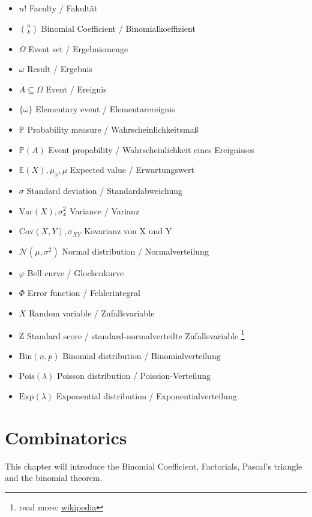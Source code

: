 \documentclass[twoside, a4paper, twocolumn]{article}
\begin{document}
    \begin{itemize}
       \item $n!$ Faculty / Fakultät
       \item $\binom{n}{k}$ Binomial Coefficient / Binomialkoeffizient
       \item $\Omega$ Event set / Ergebnismenge
       \item $\omega$ Result / Ergebnis
       \item $A \subseteq \Omega$ Event / Ereignis
       \item $\{\omega\}$ Elementary event / Elementarereignis
       \item $\mathbb{P}$ Probability measure / Wahrscheinlichkeitsmaß
       \item $\mathbb{P}(A)$ Event propability / Wahrscheinlichkeit eines Ereignisses
       \item $\mathbb{E}(X), \mu_x, \mu$ Expected value / Erwartungswert
       \item $\sigma$ Standard deviation / Standardabweichung
       \item $\mathrm{Var}(X), \sigma^2_x$ Variance / Varianz
       \item $\mathrm{Cov}(X,Y), \sigma_{XY}$ Kovarianz von X und Y
       \item $\mathcal{N}(\mu, \sigma^2)$ Normal distribution / Normalverteilung
       \item $\varphi$ Bell curve / Glockenkurve
       \item $\Phi$ Error function / Fehlerintegral
       \item $X$ Random variable / Zufallsvariable
       \item $\mathrm{Z}$ Standard score / standard-normalverteilte
           Zufallsvariable
           \footnote{read more: \href{https://en.wikipedia.org/wiki/Standard_score}{wikipedia}}
       \item $\textrm{Bin}(n, p)$ Binomial distribution / Binomialverteilung
       \item $\textrm{Pois}(\lambda)$ Poisson distribution / Poission-Verteilung
       \item $\textrm{Exp}(\lambda)$ Exponential distribution / Exponentialverteilung
    \end{itemize}

    \section{Combinatorics}
    This chapter will introduce the Binomial Coefficient, Factorials, Pascal's
    triangle and the binomial theorem.
\end{document}
